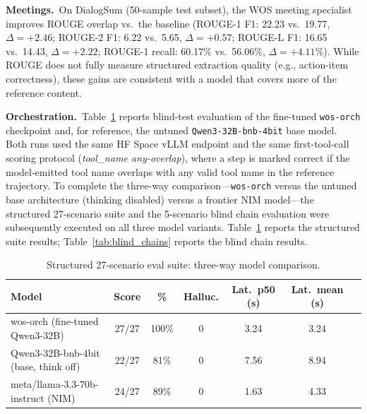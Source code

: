 \documentclass[conference]{IEEEtran}
\begin{document}
\textbf{Meetings.}\, On DialogSum (50-sample test subset), the WOS meeting specialist improves ROUGE overlap vs.\ the baseline (ROUGE-1 F1: 22.23 vs.\ 19.77, \(\Delta=+2.46\); ROUGE-2 F1: 6.22 vs.\ 5.65, \(\Delta=+0.57\); ROUGE-L F1: 16.65 vs.\ 14.43, \(\Delta=+2.22\); ROUGE-1 recall: 60.17\% vs.\ 56.06\%, \(\Delta=+4.11\%\)). While ROUGE does not fully measure structured extraction quality (e.g., action-item correctness), these gains are consistent with a model that covers more of the reference content.

\textbf{Orchestration.}\, Table~\ref{tab:structured_eval} reports blind-test evaluation of the fine-tuned \texttt{wos-orch} checkpoint and, for reference, the untuned \texttt{Qwen3-32B-bnb-4bit} base model. Both runs used the same HF Space vLLM endpoint and the same first-tool-call scoring protocol (\emph{tool\_name any-overlap}), where a step is marked correct if the model-emitted tool name overlaps with any valid tool name in the reference trajectory. To complete the three-way comparison---\texttt{wos-orch} versus the untuned base architecture (thinking disabled) versus a frontier NIM model---the structured 27-scenario suite and the 5-scenario blind chain evaluation were subsequently executed on all three model variants. Table~\ref{tab:structured_eval} reports the structured suite results; Table~\ref{tab:blind_chains} reports the blind chain results.

\begin{table}[!t]
\caption{Structured 27-scenario eval suite: three-way model comparison.}
\label{tab:structured_eval}
\centering\footnotesize\setlength{\tabcolsep}{4pt}
\renewcommand{\arraystretch}{1.15}
\begin{tabular}{@{}lcccccc@{}}
\toprule
\textbf{Model} & \textbf{Score} & \textbf{\%} & \textbf{Halluc.} & \textbf{Lat.\ p50 (s)} & \textbf{Lat.\ mean (s)} \\
\midrule
wos-orch (fine-tuned Qwen3-32B)       & 27/27 & 100\% & 0 & 3.24 & 3.24 \\
Qwen3-32B-bnb-4bit (base, think off)  & 22/27 & 81\%  & 0 & 7.56 & 8.94 \\
meta/llama-3.3-70b-instruct (NIM)     & 24/27 & 89\%  & 0 & 1.63 & 4.33 \\
\bottomrule
\end{tabular}
\end{table}
\end{document}
